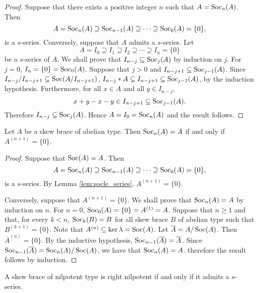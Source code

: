 \begin{proof}
    Suppose that there exists a positive integer $n$ such
that $A=\operatorname{Soc}_n(A)$. Then 
\[
A=\operatorname{Soc}_n(A)\supseteq
\operatorname{Soc}_{n-1}(A)\supseteq\cdots\supseteq \operatorname{Soc}_0(A)=\{0\},
\] is a
$s$-series. Conversely, suppose that $A$ admits a $s$-series.
Let 
\[
A=I_0\supseteq I_1\supseteq I_2\supseteq\cdots\supseteq I_n=\{0\}
\]
be a $s$-series of $A$. We shall prove that $I_{n-j}\subseteq
\operatorname{Soc}_{j}(A)$ by induction on $j$. For $j=0$, $I_n=\{0\}=\operatorname{Soc}_0(A)$.
Suppose that $j>0$ and $I_{n-j+1}\subseteq \operatorname{Soc}_{j-1}(A)$. Since
$I_{n-j}/I_{n-j+1}\subseteq \operatorname{Soc}(A/I_{n-j+1})$, $I_{n-j}*A\subseteq
I_{n-j+1}\subseteq \operatorname{Soc}_{j-1}(A)$, by the induction hypothesis.
Furthermore, for all $x\in A$ and all $y\in I_{n-j}$, 
\[
x+y-x-y\in
I_{n-j+1}\subseteq \operatorname{Soc}_{j-1}(A).
\]
Therefore
$I_{n-j}\subseteq\operatorname{Soc}_j(A)$. Hence $A=I_0=\operatorname{Soc}_n(A)$ and the result
follows.
\end{proof}

\begin{proposition}
    \label{pro:rightnilpotentabelian}
    Let $A$ be a skew brace of abelian type. Then $\operatorname{Soc}_n(A)=A$ if and only if $A^{(n+1)}=\{ 0\}$.
\end{proposition}
\begin{proof}
    Suppose that $\operatorname{Soc}(A)=A$. Then 
\[
A=\operatorname{Soc}_n(A)\supseteq
\operatorname{Soc}_{n-1}(A)\supseteq\cdots\supseteq \operatorname{Soc}_0(A)=\{0\},
\] is a
$s$-series. By Lemma \ref{lem:socle_series}, $A^{(n+1)}=\{ 0\}$. 

Conversely, suppose that $A^{(n+1)}=\{ 0\}$. We shall prove that $\operatorname{Soc}_n(A)=A$ by induction on $n$. For $n=0$, $\operatorname{Soc}_0(A)=\{ 0\}=A^{(1)}=A$. Suppose that $n\geq 1$ and that, for every $k<n$, $\operatorname{Soc}_k(B)=B$ for all skew brace $B$ of abelian type such that $B^{(k+1)}=\{ 0\}$.  Note that $A^{(n)}\subseteq \ker\lambda=\operatorname{Soc}(A)$. Let $\overline{A}=A/\operatorname{Soc}(A)$. Then $\overline{A}^{(n)}=\{ 0\}$. By the inductive hypothesis, $\operatorname{Soc}_{n-1}(\overline{A})=\overline{A}$. Since $\operatorname{Soc}_{n-1}(\overline{A})=\operatorname{Soc}_n(A)/\operatorname{Soc}(A)$, we have that $\operatorname{Soc}_n(A)=A$. therefore the result follows by induction.  
\end{proof}

\begin{proposition}
    \label{pro:right_nilpotent}
    A skew brace of nilpotent type is right nilpotent if and only if it admits a $s$-series.
\end{proposition}

